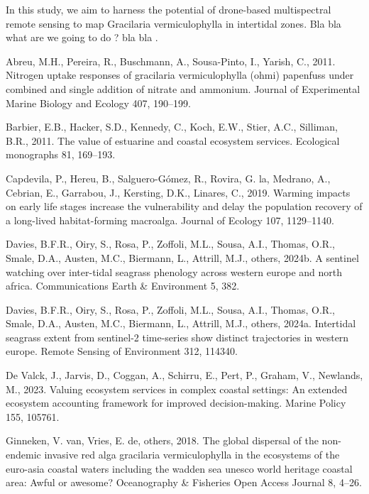 \documentclass[
  letterpaper,
  DIV=11,
  numbers=noendperiod]{scrartcl}
\newlength{\cslhangindent}
\newenvironment{CSLReferences}[2] %
 {\begin{list}{}{%
  \setlength{\itemindent}{0pt}
  \setlength{\leftmargin}{0pt}
  \setlength{\parsep}{0pt}
  \ifodd #1
   \setlength{\leftmargin}{\cslhangindent}
   \setlength{\itemindent}{-1\cslhangindent}
  \fi
  \setlength{\itemsep}{#2\baselineskip}}}
 {\end{list}}
\begin{document}
In this study, we aim to harness the potential of drone-based
multispectral remote sensing to map Gracilaria vermiculophylla in
intertidal zones. Bla bla what are we going to do ? bla bla .

\label{refs}
\begin{CSLReferences}{1}{0}
Abreu, M.H., Pereira, R., Buschmann, A., Sousa-Pinto, I., Yarish, C.,
2011. Nitrogen uptake responses of gracilaria vermiculophylla (ohmi)
papenfuss under combined and single addition of nitrate and ammonium.
Journal of Experimental Marine Biology and Ecology 407, 190--199.

Barbier, E.B., Hacker, S.D., Kennedy, C., Koch, E.W., Stier, A.C.,
Silliman, B.R., 2011. The value of estuarine and coastal ecosystem
services. Ecological monographs 81, 169--193.

Capdevila, P., Hereu, B., Salguero-Gómez, R., Rovira, G. la, Medrano,
A., Cebrian, E., Garrabou, J., Kersting, D.K., Linares, C., 2019.
Warming impacts on early life stages increase the vulnerability and
delay the population recovery of a long-lived habitat-forming macroalga.
Journal of Ecology 107, 1129--1140.

Davies, B.F.R., Oiry, S., Rosa, P., Zoffoli, M.L., Sousa, A.I., Thomas,
O.R., Smale, D.A., Austen, M.C., Biermann, L., Attrill, M.J., others,
2024b. A sentinel watching over inter-tidal seagrass phenology across
western europe and north africa. Communications Earth \& Environment 5,
382.

Davies, B.F.R., Oiry, S., Rosa, P., Zoffoli, M.L., Sousa, A.I., Thomas,
O.R., Smale, D.A., Austen, M.C., Biermann, L., Attrill, M.J., others,
2024a. Intertidal seagrass extent from sentinel-2 time-series show
distinct trajectories in western europe. Remote Sensing of Environment
312, 114340.

De Valck, J., Jarvis, D., Coggan, A., Schirru, E., Pert, P., Graham, V.,
Newlands, M., 2023. Valuing ecosystem services in complex coastal
settings: An extended ecosystem accounting framework for improved
decision-making. Marine Policy 155, 105761.

Ginneken, V. van, Vries, E. de, others, 2018. The global dispersal of
the non-endemic invasive red alga gracilaria vermiculophylla in the
ecosystems of the euro-asia coastal waters including the wadden sea
unesco world heritage coastal area: Awful or awesome? Oceanography \&
Fisheries Open Access Journal 8, 4--26.


\end{CSLReferences}
\end{document}

